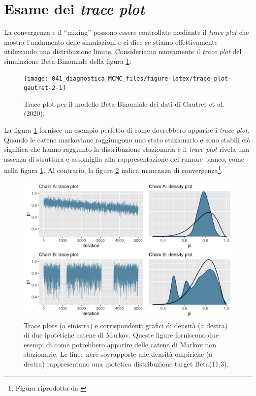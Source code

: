 \documentclass[
  11pt,
  italian,
  a4paper,
  extrafontsizes,onecolumn,openright
  ]{memoir}
\newlength{\rf}
\begin{document}
\hypertarget{esame-dei-trace-plot}{%
\section{\texorpdfstring{Esame dei \emph{trace plot}}{Esame dei trace plot}}\label{esame-dei-trace-plot}}

La convergenza e il ``mixing'' possono essere controllate mediante il \emph{trace plot} che mostra l'andamento delle simulazioni e ci dice se stiamo effettivamente utilizzando una distribuzione limite. Consideriamo nuovamente il \emph{trace plot} del simulazione Beta-Binomiale della figura \ref{fig:trace-plot-gautret-2}:

\begin{figure}

{\centering \texttt{[image: 041\_diagnostica\_MCMC\_files/figure-latex/trace-plot-gautret-2-1]} 

}

\caption{Trace plot per il modello Beta-Binomiale dei dati di Gautret et al.(2020).}\label{fig:trace-plot-gautret-2}
\end{figure}

La figura \ref{fig:trace-plot-gautret-2} fornisce un esempio perfetto di come dovrebbero apparire i \emph{trace plot}. Quando le catene markoviane raggiungono uno stato stazionario e sono stabili ciò significa che hanno raggiunto la distribuzione stazionaria e il \emph{trace plot} rivela una assenza di struttura e assomiglia alla rappresentazione del rumore bianco, come nella figura \ref{fig:trace-plot-gautret-2}.
Al contrario, la figura \ref{fig:bad-trace-bayesrules} indica mancanza di convergenza\footnote{Figura riprodotta da \textcite{Johnson2022bayesrules}}.

\begin{figure}

{\centering \includegraphics[width=32.81in]{images/bad-trace-bayesrules} 

}

\caption{Trace plots (a sinistra) e corrispondenti grafici di densità (a destra) di due ipotetiche catene di Markov. Queste figure forniscono due esempi di come potrebbero apparire delle catene di Markov non stazionarie. Le linee nere sovrapposte alle densità empiriche (a destra) rappresentano una ipotetica distribuzione target Beta(11,3).}\label{fig:bad-trace-bayesrules}
\end{figure}
\end{document}
